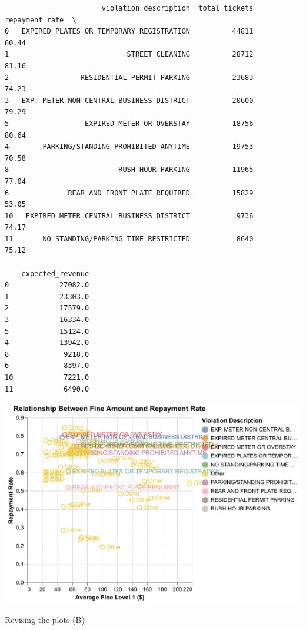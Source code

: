 \documentclass[
  letterpaper,
  DIV=11,
  numbers=noendperiod]{scrartcl}
\begin{document}
\begin{verbatim}
                       violation_description  total_tickets  repayment_rate  \
0   EXPIRED PLATES OR TEMPORARY REGISTRATION          44811           60.44   
1                            STREET CLEANING          28712           81.16   
2                 RESIDENTIAL PERMIT PARKING          23683           74.23   
3   EXP. METER NON-CENTRAL BUSINESS DISTRICT          20600           79.29   
5                  EXPIRED METER OR OVERSTAY          18756           80.64   
4        PARKING/STANDING PROHIBITED ANYTIME          19753           70.58   
8                          RUSH HOUR PARKING          11965           77.04   
6              REAR AND FRONT PLATE REQUIRED          15829           53.05   
10   EXPIRED METER CENTRAL BUSINESS DISTRICT           9736           74.17   
11       NO STANDING/PARKING TIME RESTRICTED           8640           75.12   

    expected_revenue  
0            27082.0  
1            23303.0  
2            17579.0  
3            16334.0  
5            15124.0  
4            13942.0  
8             9218.0  
6             8397.0  
10            7221.0  
11            6490.0  
\end{verbatim}

\includegraphics{ps2_answers_files/figure-pdf/cell-26-output-2.png}

Revising the plots (B)
\end{document}
